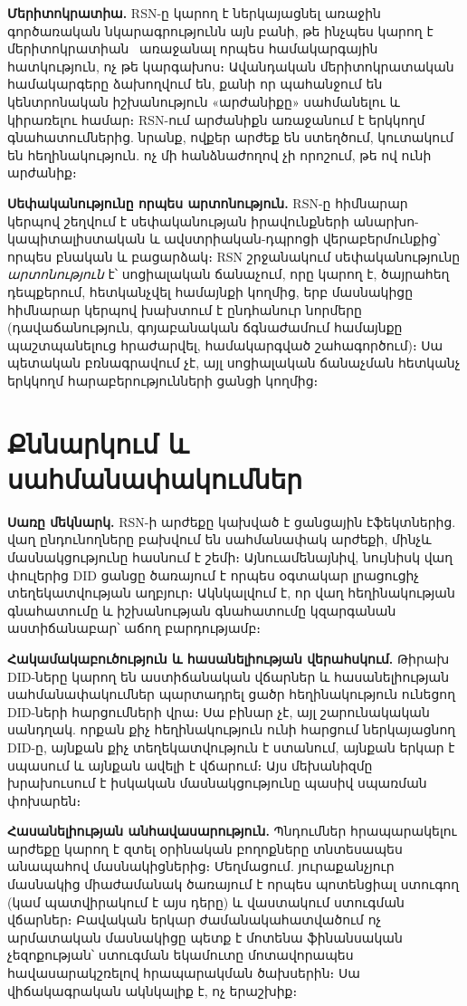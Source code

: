 \documentclass[11pt,a4paper,twocolumn]{article}
\begin{document}
\textbf{Մերիտոկրատիա.} RSN-ը կարող է ներկայացնել առաջին գործառական նկարագրությունն այն բանի, թե ինչպես կարող է մերիտոկրատիան~\cite{young1958} առաջանալ որպես համակարգային հատկություն, ոչ թե կարգախոս։ Ավանդական մերիտոկրատական համակարգերը ձախողվում են, քանի որ պահանջում են կենտրոնական իշխանություն «արժանիքը» սահմանելու և կիրառելու համար։ RSN-ում արժանիքն առաջանում է երկկողմ գնահատումներից. նրանք, ովքեր արժեք են ստեղծում, կուտակում են հեղինակություն. ոչ մի հանձնաժողով չի որոշում, թե ով ունի արժանիք։

\textbf{Սեփականությունը որպես արտոնություն.} RSN-ը հիմնարար կերպով շեղվում է սեփականության իրավունքների անարխո-կապիտալիստական և ավստրիական-դպրոցի վերաբերմունքից՝ որպես բնական և բացարձակ։ RSN շրջանակում սեփականությունը \emph{արտոնություն} է՝ սոցիալական ճանաչում, որը կարող է, ծայրահեղ դեպքերում, հետկանչվել համայնքի կողմից, երբ մասնակիցը հիմնարար կերպով խախտում է ընդհանուր նորմերը (դավաճանություն, գոյաբանական ճգնաժամում համայնքը պաշտպանելուց հրաժարվել, համակարգված շահագործում)։ Սա պետական բռնագրավում չէ, այլ սոցիալական ճանաչման հետկանչ երկկողմ հարաբերությունների ցանցի կողմից։

\section{Քննարկում և սահմանափակումներ}

\textbf{Սառը մեկնարկ.} RSN-ի արժեքը կախված է ցանցային էֆեկտներից. վաղ ընդունողները բախվում են սահմանափակ արժեքի, մինչև մասնակցությունը հասնում է շեմի։ Այնուամենայնիվ, նույնիսկ վաղ փուլերից DID ցանցը ծառայում է որպես օգտակար լրացուցիչ տեղեկատվության աղբյուր։ Ակնկալվում է, որ վաղ հեղինակության գնահատումը և իշխանության գնահատումը կզարգանան աստիճանաբար՝ աճող բարդությամբ։

\textbf{Հակամակաբուծություն և հասանելիության վերահսկում.} Թիրախ DID-ները կարող են աստիճանական վճարներ և հասանելիության սահմանափակումներ պարտադրել ցածր հեղինակություն ունեցող DID-ների հարցումների վրա։ Սա բինար չէ, այլ շարունակական սանդղակ. որքան քիչ հեղինակություն ունի հարցում ներկայացնող DID-ը, այնքան քիչ տեղեկատվություն է ստանում, այնքան երկար է սպասում և այնքան ավելի է վճարում։ Այս մեխանիզմը խրախուսում է իսկական մասնակցությունը պասիվ սպառման փոխարեն։

\textbf{Հասանելիության անհավասարություն.} Պնդումներ հրապարակելու արժեքը կարող է զտել օրինական բողոքները տնտեսապես անապահով մասնակիցներից։ Մեղմացում. յուրաքանչյուր մասնակից միաժամանակ ծառայում է որպես պոտենցիալ ստուգող (կամ պատվիրակում է այս դերը) և վաստակում ստուգման վճարներ։ Բավական երկար ժամանակահատվածում ոչ արմատական մասնակիցը պետք է մոտենա ֆինանսական չեզոքության՝ ստուգման եկամուտը մոտավորապես հավասարակշռելով հրապարակման ծախսերին։ Սա վիճակագրական ակնկալիք է, ոչ երաշխիք։
\end{document}
